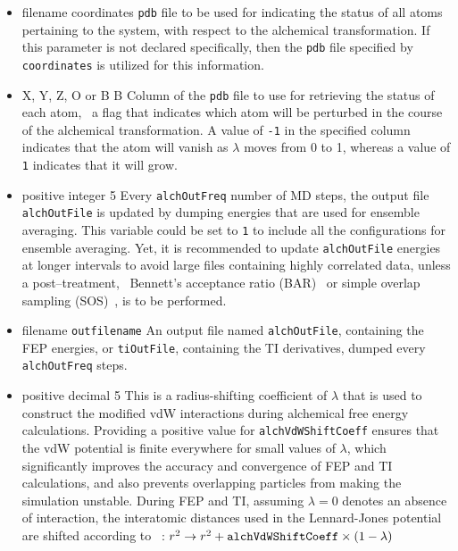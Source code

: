 \begin{itemize}
\item
{}
{filename}
{coordinates}
{{\tt pdb} file to be used for indicating the status of all
atoms pertaining to the system, with respect to the alchemical transformation.
If this parameter is not declared specifically, then the
{\tt pdb} file specified by
{\tt coordinates} is utilized for this information.}

\item
{}
{X, Y, Z, O or B}
{B}
{Column of the {\tt pdb} file to use for retrieving the status
of each atom, \ie~a flag that indicates which atom will be perturbed
in the course of the alchemical transformation.
A value of {\tt -1} in the specified column indicates that the atom will
vanish as $\lambda$ moves from 0 to 1, whereas a value of {\tt 1}
indicates that it will grow.}

\item
{}
{positive integer}
{5}
{Every {\tt alchOutFreq} number of MD steps, the output file
{\tt alchOutFile} is updated by dumping energies that are
used for ensemble averaging.
This variable could be set to {\tt 1} to include all the
configurations for ensemble averaging. Yet, it is recommended
to update {\tt alchOutFile}  energies at longer intervals
to avoid large files containing highly correlated data, unless a post--treatment,
\eg~Bennett's acceptance ratio (BAR)~\cite{Bennett1976} or simple overlap
sampling (SOS)~\cite{Lu2004}, is to be performed.}

\item
{}
{filename}
{{\tt outfilename}}
{An output file named {\tt alchOutFile},
containing the FEP energies, or {\tt tiOutFile}, containing the TI derivatives, dumped every {\tt alchOutFreq} steps.}

\item
{}
{positive decimal}
{5} %
{This is a radius-shifting coefficient of $\lambda$ that is used
to construct the modified vdW interactions during alchemical free energy calculations.
Providing a positive value for {\tt alchVdWShiftCoeff} ensures that the vdW potential
is finite everywhere for small values of $\lambda$, which significantly improves the
accuracy and convergence of FEP and TI calculations, and also prevents overlapping particles
from making the simulation unstable. During FEP and TI, assuming $\lambda = 0$
denotes an absence of interaction, the interatomic distances used in
the Lennard-Jones potential are shifted according to ~\cite{Beutler1994,Zacharias1994}:
$r^2 \rightarrow r^2 + {\tt alchVdWShiftCoeff} \times (1 - \lambda)$
}


\end{itemize}
